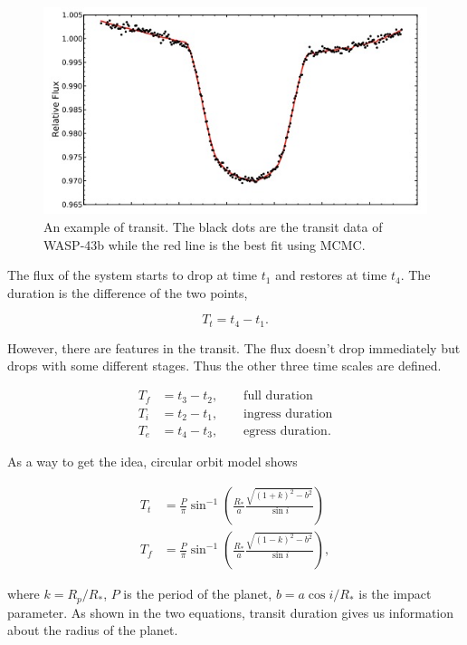 \documentclass[12pt]{article}
\begin{document}
\begin{figure}
\centering
\includegraphics[width=\textwidth]{./assets/wasp43btransit}
\caption{An example of transit. The black dots are the transit data of WASP-43b while the red line is the best fit using MCMC.\cite{2014A&A...563A..41M}}
\label{fig:wasp43btransit}
\end{figure}

The flux of the system starts to drop at time $t_1$ and restores at time $t_4$. The duration is the difference of the two points,

\begin{equation}
T_t=t_4 - t_1 .
\end{equation}


However, there are features in the transit. The flux doesn't drop immediately but drops with some different stages. Thus the other three time scales are defined.


\begin{align}
T_f &= t_3 - t_2, \qquad \text{full duration} \\
T_i &= t_2-t_1, \qquad \text{ingress duration} \\
T_e &= t_4 - t_3, \qquad \text{egress duration} .
\end{align}


As a way to get the idea, circular orbit model shows \cite{2010arXiv1001.2010W}

\begin{align}
T_t &= \frac{P}{\pi} \sin^{-1} \left( \frac{R_*}{a} \frac{\sqrt{(1+k)^2 - b^2 }}{ \sin i } \right) \\
T_f &= \frac{P}{\pi} \sin^{-1} \left( \frac{R_*}{a} \frac{\sqrt{(1 - k)^2 - b^2 }}{ \sin i } \right) ,
\end{align}

where $k = R_p/R_*$, $P$ is the period of the planet, $b = a\cos i/R_*$ is the impact parameter. As shown in the two equations, transit duration gives us information about the radius of the planet.
\end{document}
